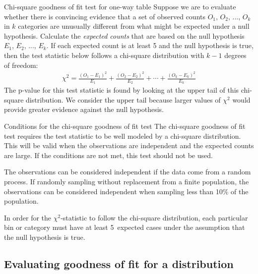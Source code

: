 \begin{onebox}{Chi-square goodness of fit test for one-way table}
Suppose we are to evaluate whether there is convincing evidence that a set of observed counts $O_1$, $O_2$, ..., $O_k$ in $k$ categories are unusually different from what might be expected under a null hypothesis. Calculate the \emph{expected counts} that are based on the null hypothesis $E_1$, $E_2$, ..., $E_k$. If each expected count is at least 5 and the null hypothesis is true, then the test statistic below follows a chi-square distribution with $k-1$ degrees of freedom:
\begin{align*}
\chi^2 = \frac{(O_1 - E_1)^2}{E_1} + \frac{(O_2 - E_2)^2}{E_2} + \cdots + \frac{(O_k - E_k)^2}{E_k}
\end{align*}
The p-value for this test statistic is found by looking at the upper tail of this chi-square distribution. We consider the upper tail because larger values of $\chi^2$ would provide greater evidence against the null hypothesis.\end{onebox}

\begin{onebox}{Conditions for the chi-square goodness of fit test}
The chi-square goodness of fit test requires the test statistic to be well modeled by a chi-square distribution.  This will be valid when the observations are independent and the expected counts are large.  If the conditions are not met, this test should not be used.\vspace{-1mm}
\begin{description}
\setlength{\itemsep}{0mm}
\item[Independence.] The observations can be considered independent if the data come from a random process.  If randomly sampling without replacement from a finite population, the observations can be considered independent when sampling less than 10\% of the population.  
\item[Large expected counts.] In order for the $\chi^2$-statistic to follow the chi-square distribution, each particular bin or category must have at least \mbox{5~expected} cases under the assumption that the null hypothesis is true.
\vspace{-2mm}
\end{description}
\end{onebox}


\D{\newpage}

\subsection{Evaluating goodness of fit for a distribution}

